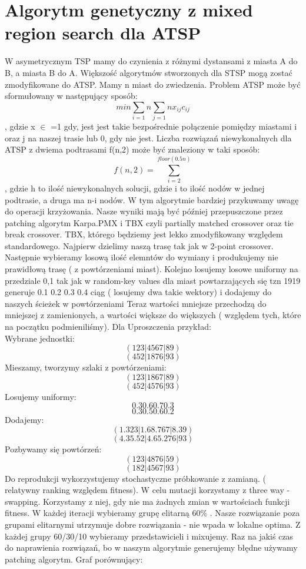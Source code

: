 \documentclass[11pt]{article}
\begin{document}
\section{Algorytm genetyczny z mixed region search dla ATSP}
W asymetrycznym TSP mamy do czynienia z różnymi dystansami z miasta A do B, a miasta B do A. Większość algorytmów stworzonych dla STSP mogą zostać zmodyfikowane do ATSP. Mamy n miast do zwiedzenia. Problem ATSP może być sformułowany w następujący sposób:
$$ min \sum_{i=1}{n}\sum_{j=1}{n}x_{ij}c_{ij}$$, gdzie x $\in$  =1 gdy, jest jest takie bezpośrednie połączenie pomiędzy miastami i oraz j na naszej trasie lub 0, gdy nie jest. Liczba rozwiązań niewykonalnych dla ATSP z dwiema podtrasami f(n,2) może być znaleziony w taki sposób: \\
$$f(n,2)=\sum_{i=2}^{floor(0.5n)}$$, gdzie h to ilość niewykonalnych solucji, gdzie i to ilość nodów w jednej podtrasie, a druga ma  n-i nodów. W tym algorytmie bardziej przykuwamy uwagę do operacji krzyżowania. Nasze wyniki mają być później przepuszczone przez patching algorytm Karpa.PMX i TBX czyli partially matched crossover oraz tie break crossover. TBX, którego będziemy jest lekko zmodyfikowany względem standardowego. Najpierw dzielimy naszą trasę tak jak w 2-point crossover. Następnie wybieramy losową ilość elemntów do wymiany i produkujemy nie prawidłową trasę ( z powtórzeniami miast). Kolejno losujemy losowe uniformy na przedziale 0,1 tak jak w random-key values dla miast powtarzających się tzn 1919 generuje 0.1 0.2 0.3 0.4 ciąg  ( losujemy dwa takie wektory) i dodajemy do naszych ścieżek w powtórzeniami Teraz wartości mniejsze przechodzą do mniejszej z zamienionych, a wartości większe do większych ( względem tych, które na początku podmieniliśmy). Dla Uproszczenia przykład:\\
Wybrane jednostki:\\
$$ (1 2 3 | 4 5 6 7 | 8 9)$$
$$ (4 5 2 | 1 8 7 6 | 9 3)$$
Mieszamy, tworzymy szlaki z powtórzeniami:\\
$$ (1 2 3 | 1 8 6 7 | 8 9)$$
$$ (4 5 2 | 4 5 7 6 | 9 3)$$
Losujemy uniformy:\\
$$ 0.3 0.6 0.7 0.3 $$
$$ 0.3 0.5 0.6 0.2 $$
Dodajemy:\\
$$ (1.3 2 3 | 1.6 8.7 6 7 | 8.3 9)$$
$$ (4.3 5.5 2 | 4.6 5.2 7 6 | 9 3)$$
Pozbywamy się powtórzeń:\\
$$ (1 2 3 | 4 8 7 6 | 5 9)$$
$$ (1 8 2 | 4 5 6 7 | 9 3)$$
Do reprodukcji wykorzystujemy stochastyczne próbkowanie z zamianą. ( relatywny ranking względem fitness). W celu mutacji korzystamy z three way -swapping. Korzystamy z niej, gdy nie ma żadnych zmian w wartościach funkcji fitness. W każdej iteracji wybieramy grupę elitarną 60\% . Nasze rozwiązanie poza grupami elitarnymi utrzymuje dobre rozwiązania - nie wpada w lokalne optima. Z każdej grupy 60/30/10 wybieramy przedstawicieli i mixujemy. Raz na jakiś czas do naprawienia rozwiązań, bo w naszym algorytmie generujemy błędne używamy patching algorytm. Graf porównujący:
\end{document}
